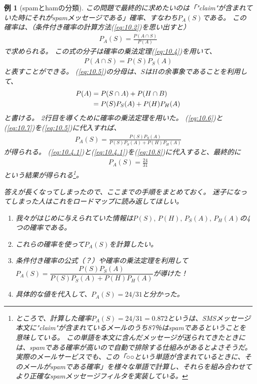 \documentclass[luatexja,fontsize=12pt]{jlreq}\usepackage{ifthen}\newcounter{enlarge}\setcounter{enlarge}{1}
\newtheorem{eg}{例}
\begin{document}
\begin{eg}[spamとhamの分類]
この問題で最終的に求めたいのは「"claim"が含まれていた時にそれがspamメッセージである」確率、すなわち$P_A (S)$である。
この確率は、（条件付き確率の計算方法(\ref{eq:10.2})を思い出すと）
\begin{align} \label{eq:10.5}
P_A (S) = \frac{P(A \cap S)}{P(A)}
\end{align}
で求められる。
この式の分子は確率の乗法定理(\ref{eq:10.4})を用いて、
\begin{align}
P(A \cap S) = P(S) P_S (A) \label{eq:10.6}
\end{align}
と表すことができる。
(\ref{eq:10.5})の分母は、$S$は$H$の余事象であることを利用して、
\begin{align}
P(A) &= P(S \cap A) + P(H \cap B) \notag \\
&= P(S) P_S (A) + P(H) P_H (A) \label{eq:10.7}
\end{align}
と書ける。
2行目を導くために確率の乗法定理を用いた。
(\ref{eq:10.6})と(\ref{eq:10.7})を(\ref{eq:10.5})に代入すれば、
\begin{align} \label{eq:10.8}
P_A (S) = \frac{P(S) P_S (A)}{P(S) P_S (A) + P(H) P_H (A)}
\end{align}
が得られる。
(\ref{eq:10.4.1})と(\ref{eq:10.4.1})を(\ref{eq:10.8})に代入すると、最終的に
\begin{align}
P_A (S) = \frac{24}{31}
\end{align}
という結果が得られる\footnote{%
ところで、計算した確率$P_A (S) = 24/31 = 0.872$というは、SMSメッセージ本文に"claim"が含まれているメールのうち87％はspamであるということを意味している。
この単語を本文に含んだメッセージが送られてきたときには、spamである確率が高いので自動で排除する仕組みがあるとよさそうだ。
実際のメールサービスでも、この「○○という単語が含まれているときに、そのメールがspamである確率」を様々な単語で計算し、それらを組み合わせてより正確なspamメッセージフィルタを実装している。
}。

答えが長くなってしまったので、ここまでの手順をまとめておく。
迷子になってしまった人はこれをロードマップに読み返してほしい。
\begin{enumerate}
\item 我々がはじめに与えられていた情報は$P(S),\, P(H),\, P_S (A),\, P_H (A)$の4つの確率である。
\item これらの確率を使って$P_A (S)$を計算したい。
\item 条件付き確率の公式（？）や確率の乗法定理を利用して$P_A (S) = \dfrac{P(S) P_S (A)}{P(S) P_S (A) + P(H) P_H (A)}$が導けた！
\item 具体的な値を代入して、$P_A (S) = 24/31$と分かった。
\end{enumerate}
\end{eg}
\end{document}
